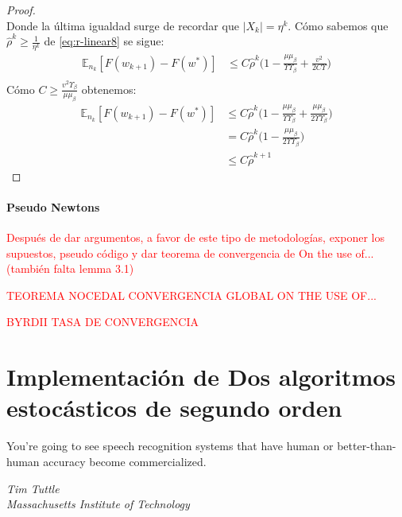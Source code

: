 \documentclass{book}
\theoremstyle{plain}
\theoremstyle{definition}
\theoremstyle{remark}
\begin{document}
\begin{proof}
\begin{equation}
\end{equation}
Donde la última igualdad surge de recordar que $|X_k|=\eta^k$. Cómo sabemos que $\hat{\rho}^k \geq \frac{1}{\eta^k}$ de \ref{eq:r-linear8} se sigue: 
\begin{equation}\label{eq:r-linear9} 
    \begin{split}
        \mathbb{E}_{n_k}[F(w_{k+1})- F(w^*)] & \leq C\hat{\rho}^k\bigg(1 -\frac{\mu\mu_\beta}{\Upsilon\Upsilon_\beta}+ \frac{v^2}{2C\Upsilon}\bigg)\\
    \end{split}
\end{equation}
Cómo $C \geq \frac{v^2\Upsilon_\beta}{\mu\mu_\beta}$ obtenemos:
\begin{equation}\label{eq:r-linear8} 
    \begin{split}
        \mathbb{E}_{n_k}[F(w_{k+1})- F(w^*)] & \leq C\hat{\rho}^k\bigg(1 -\frac{\mu\mu_\beta}{\Upsilon\Upsilon_\beta}+\frac{\mu\mu_\beta}{2\Upsilon\Upsilon_\beta}\bigg)\\
         & = C\hat{\rho}^k\bigg(1 -\frac{\mu\mu_\beta}{2\Upsilon\Upsilon_\beta}\bigg)\\
         & \leq C\hat{\rho}^{k+1}
    \end{split}
\end{equation}




\end{proof}



\subsubsection{Pseudo Newtons}

\textcolor{red}{Después de dar argumentos, a favor de este tipo de metodologías, exponer los supuestos, pseudo código y dar teorema de convergencia de On the use of... (también falta lemma 3.1)}

\textcolor{red}{TEOREMA NOCEDAL CONVERGENCIA GLOBAL ON THE USE OF...}

\textcolor{red}{BYRDII TASA DE CONVERGENCIA}


\chapter{Implementación de Dos algoritmos estocásticos de segundo orden}


\epigraph{You're going to see speech recognition systems that have human or better-than-human accuracy become commercialized.}{\textit{Tim Tuttle \\ Massachusetts Institute of Technology}}
\end{document}
